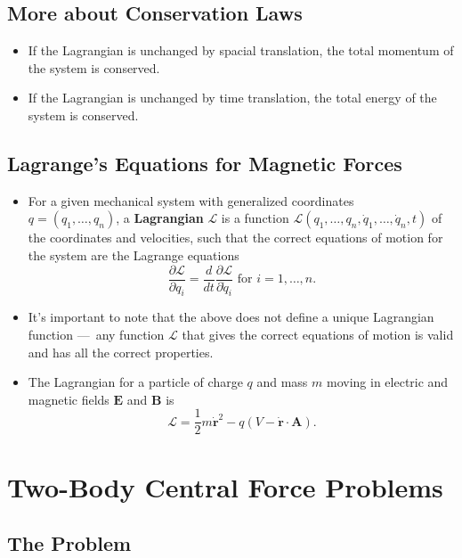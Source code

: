 \documentclass{article}
\renewcommand{\vec}[1]{\boldsymbol{\mathbf{#1}}}
\newcommand{\dvec}[1]{\dot{\vec{#1}}}
\begin{document}
\setcounter{subsection}{7}
\subsection{More about Conservation Laws}

\begin{itemize}
  \item If the Lagrangian is unchanged by spacial translation, the total momentum of the system is conserved.

  \item If  the Lagrangian is unchanged by time translation, the total energy of the system is conserved.
\end{itemize}

\subsection{Lagrange's Equations for Magnetic Forces}

\begin{itemize}
  \item For a given mechanical system with generalized coordinates \\ $q = (q_1, \ldots, q_n)$, a \textbf{Lagrangian} $\mathcal{L}$ is a function $\mathcal{L} (q_1, \ldots, q_n, \dot{q}_1, \ldots, \dot{q}_n, t)$ of the coordinates and velocities, such that the correct equations of motion for the system are the Lagrange equations \[\frac{\partial \mathcal{L}}{\partial q_i} = \frac{d}{d t} \frac{\partial \mathcal{L}}{\partial \dot{q}_i} \text{ for } i = 1, \ldots, n.\]

  \item It's important to note that the above does not define a unique Lagrangian function — any function $\mathcal{L}$ that gives the correct equations of motion is valid and has all the correct properties.

  \item The Lagrangian for a particle of charge $q$ and mass $m$ moving in electric and magnetic fields $\vec{E}$ and $\vec{B}$ is \[\mathcal{L} = \frac{1}{2} m \dvec{r}^2 - q (V - \dvec{r} \cdot \vec{A}).\]
\end{itemize}

\section{Two-Body Central Force Problems}

\subsection{The Problem}
\end{document}
